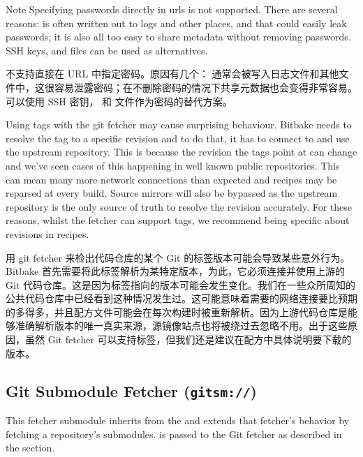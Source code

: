 \medskip
\begin{noteblock}{Note}%
Specifying passwords directly in  urls is not supported. There are several reasons:  is often written out to logs and other places, and that could easily leak passwords; it is also all too easy to share metadata without removing passwords. SSH keys,  and  files can be used as alternatives.

\medskip
{} 不支持直接在 URL 中指定密码。原因有几个：  通常会被写入日志文件和其他文件中，这很容易泄露密码；在不删除密码的情况下共享元数据也会变得非常容易。可以使用 SSH 密钥， 和  文件作为密码的替代方案。
\end{noteblock}

Using tags with the git fetcher may cause surprising behaviour. Bitbake needs to resolve the tag to a specific revision and to do that, it has to connect to and use the upstream repository. This is because the revision the tags point at can change and we've seen cases of this happening in well known public repositories. This can mean many more network connections than expected and recipes may be reparsed at every build. Source mirrors will also be bypassed as the upstream repository is the only source of truth to resolve the revision accurately. For these reasons, whilst the fetcher can support tags, we recommend being specific about revisions in recipes.

用 git fetcher 来检出代码仓库的某个 Git 的标签版本可能会导致某些意外行为。Bitbake 首先需要将此标签解析为某特定版本，为此，它必须连接并使用上游的 Git 代码仓库。这是因为标签指向的版本可能会发生变化。我们在一些众所周知的公共代码仓库中已经看到这种情况发生过。这可能意味着需要的网络连接要比预期的多得多，并且配方文件可能会在每次构建时被重新解析。因为上游代码仓库是能够准确解析版本的唯一真实来源，源镜像站点也将被绕过去忽略不用。出于这些原因，虽然 Git fetcher 可以支持标签，但我们还是建议在配方中具体说明要下载的版本。

\subsection{Git Submodule Fetcher (\texttt{gitsm://})}

This fetcher submodule inherits from the  and extends that fetcher's behavior by fetching a repository's submodules.  is passed to the Git fetcher as described in the  section.

